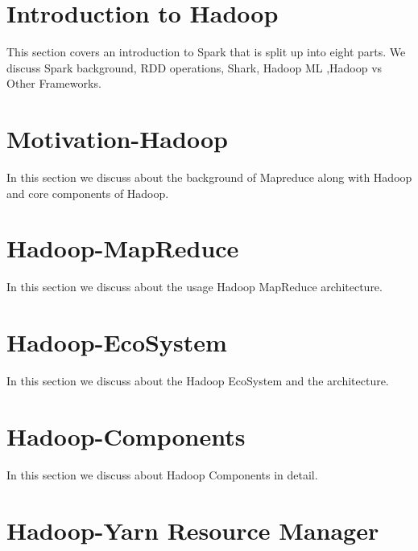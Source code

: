 
\section{Introduction to Hadoop}
\label{c:spark}

This section covers an introduction to Spark that is split up
into eight parts. We discuss Spark background, RDD operations,
Shark, Hadoop ML ,Hadoop vs Other Frameworks.

\section{Motivation-Hadoop}
\label{s:motivation-spark}

In this section we discuss about the background of Mapreduce along with Hadoop and
core components of Hadoop.

\section{Hadoop-MapReduce}

In this section we discuss about the usage Hadoop MapReduce architecture.

\section{Hadoop-EcoSystem}

In this section we discuss about the Hadoop EcoSystem and the architecture. 

\section{Hadoop-Components}

In this section we discuss about Hadoop Components in detail.


\section{Hadoop-Yarn Resource Manager}

